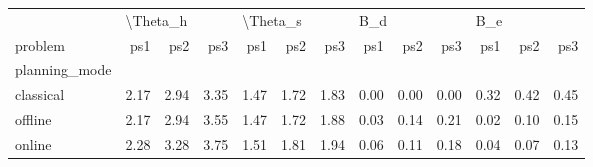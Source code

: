 \begin{tabular}{lrrrrrrrrrrrr}
\toprule
{} & \multicolumn{3}{l}{\textbackslash Theta\_h} & \multicolumn{3}{l}{\textbackslash Theta\_s} & \multicolumn{3}{l}{B\_d} & \multicolumn{3}{l}{B\_e} \\
problem &      ps1 &  ps2 &  ps3 &      ps1 &  ps2 &  ps3 &  ps1 &  ps2 &  ps3 &  ps1 &  ps2 &  ps3 \\
planning\_mode &          &      &      &          &      &      &      &      &      &      &      &      \\
\midrule
classical     &     2.17 & 2.94 & 3.35 &     1.47 & 1.72 & 1.83 & 0.00 & 0.00 & 0.00 & 0.32 & 0.42 & 0.45 \\
offline       &     2.17 & 2.94 & 3.55 &     1.47 & 1.72 & 1.88 & 0.03 & 0.14 & 0.21 & 0.02 & 0.10 & 0.15 \\
online        &     2.28 & 3.28 & 3.75 &     1.51 & 1.81 & 1.94 & 0.06 & 0.11 & 0.18 & 0.04 & 0.07 & 0.13 \\
\bottomrule
\end{tabular}
